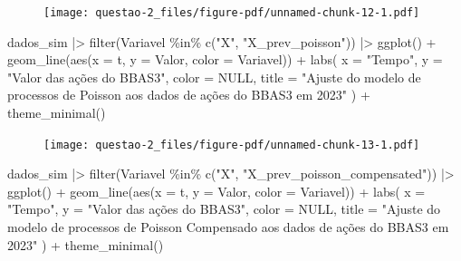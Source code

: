 \documentclass[
  letterpaper,
  DIV=11,
  numbers=noendperiod]{scrreprt}
\newenvironment{Shaded}{\begin{snugshade}}{\end{snugshade}}
\newcommand{\AttributeTok}[1]{\textcolor[rgb]{0.40,0.45,0.13}{#1}}
\newcommand{\ConstantTok}[1]{\textcolor[rgb]{0.56,0.35,0.01}{#1}}
\newcommand{\FunctionTok}[1]{\textcolor[rgb]{0.28,0.35,0.67}{#1}}
\newcommand{\NormalTok}[1]{\textcolor[rgb]{0.00,0.23,0.31}{#1}}
\newcommand{\SpecialCharTok}[1]{\textcolor[rgb]{0.37,0.37,0.37}{#1}}
\newcommand{\StringTok}[1]{\textcolor[rgb]{0.13,0.47,0.30}{#1}}
\begin{document}
\begin{figure}[H]

{\centering \texttt{[image: questao-2\_files/figure-pdf/unnamed-chunk-12-1.pdf]}

}

\end{figure}

\begin{Shaded}
\begin{Highlighting}[]
\NormalTok{dados\_sim }\SpecialCharTok{|\textgreater{}}
    \FunctionTok{filter}\NormalTok{(Variavel }\SpecialCharTok{\%in\%} \FunctionTok{c}\NormalTok{(}\StringTok{"X"}\NormalTok{, }\StringTok{"X\_prev\_poisson"}\NormalTok{)) }\SpecialCharTok{|\textgreater{}}
    \FunctionTok{ggplot}\NormalTok{() }\SpecialCharTok{+}
    \FunctionTok{geom\_line}\NormalTok{(}\FunctionTok{aes}\NormalTok{(}\AttributeTok{x =}\NormalTok{ t, }\AttributeTok{y =}\NormalTok{ Valor, }\AttributeTok{color =}\NormalTok{ Variavel)) }\SpecialCharTok{+}
    \FunctionTok{labs}\NormalTok{(}
        \AttributeTok{x =} \StringTok{"Tempo"}\NormalTok{,}
        \AttributeTok{y =} \StringTok{"Valor das ações do BBAS3"}\NormalTok{,}
        \AttributeTok{color =} \ConstantTok{NULL}\NormalTok{,}
        \AttributeTok{title =} \StringTok{"Ajuste do modelo de processos de Poisson}
\StringTok{          aos dados de ações do BBAS3 em 2023"}
\NormalTok{    ) }\SpecialCharTok{+}
    \FunctionTok{theme\_minimal}\NormalTok{()}
\end{Highlighting}
\end{Shaded}

\begin{figure}[H]

{\centering \texttt{[image: questao-2\_files/figure-pdf/unnamed-chunk-13-1.pdf]}

}

\end{figure}

\begin{Shaded}
\begin{Highlighting}[]
\NormalTok{dados\_sim }\SpecialCharTok{|\textgreater{}}
    \FunctionTok{filter}\NormalTok{(Variavel }\SpecialCharTok{\%in\%} \FunctionTok{c}\NormalTok{(}\StringTok{"X"}\NormalTok{, }\StringTok{"X\_prev\_poisson\_compensated"}\NormalTok{)) }\SpecialCharTok{|\textgreater{}}
    \FunctionTok{ggplot}\NormalTok{() }\SpecialCharTok{+}
    \FunctionTok{geom\_line}\NormalTok{(}\FunctionTok{aes}\NormalTok{(}\AttributeTok{x =}\NormalTok{ t, }\AttributeTok{y =}\NormalTok{ Valor, }\AttributeTok{color =}\NormalTok{ Variavel)) }\SpecialCharTok{+}
    \FunctionTok{labs}\NormalTok{(}
        \AttributeTok{x =} \StringTok{"Tempo"}\NormalTok{,}
        \AttributeTok{y =} \StringTok{"Valor das ações do BBAS3"}\NormalTok{,}
        \AttributeTok{color =} \ConstantTok{NULL}\NormalTok{,}
        \AttributeTok{title =} \StringTok{"Ajuste do modelo de processos de Poisson Compensado}
\StringTok{          aos dados de ações do BBAS3 em 2023"}
\NormalTok{    ) }\SpecialCharTok{+}
    \FunctionTok{theme\_minimal}\NormalTok{()}
\end{Highlighting}
\end{Shaded}
\end{document}
